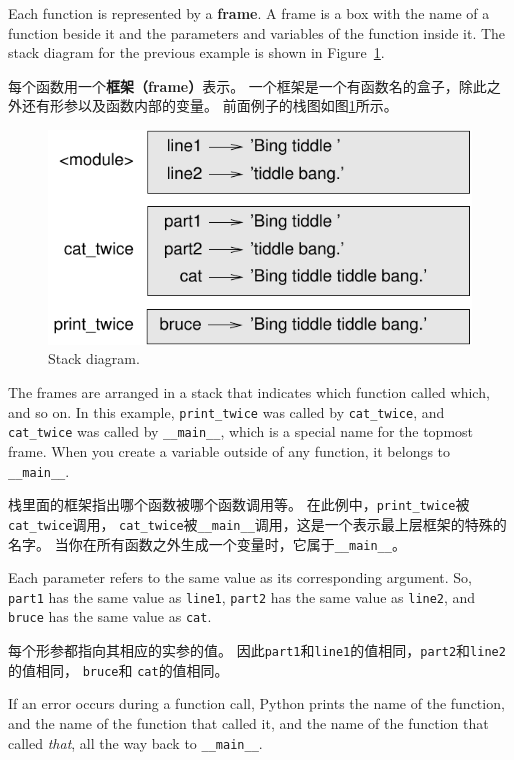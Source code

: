 \documentclass[10pt]{book}
\begin{document}
\begin{CJK}{UTF8}{gbsn}
Each function is represented by a {\bf frame}.  A frame is a box
with the name of a function
beside it and the parameters and variables of the function inside it.
The stack diagram for the
previous example is shown in Figure~\ref{fig.stack}.

每个函数用一个{\bf 框架（frame）}表示。
一个框架是一个有函数名的盒子，除此之外还有形参以及函数内部的变量。
前面例子的栈图如图\ref{fig.stack}所示。

\begin{figure}
\centerline
{\includegraphics[scale=0.8]{figs/stack.pdf}}
\caption{Stack diagram.}
\label{fig.stack}
\end{figure}


The frames are arranged in a stack that indicates which function
called which, and so on.  In this example, \verb"print_twice"
was called by \verb"cat_twice", and \verb"cat_twice" was called by 
\verb"__main__", which is a special name for the topmost frame.  When
you create a variable outside of any function, it belongs to 
\verb"__main__".

栈里面的框架指出哪个函数被哪个函数调用等。
在此例中，\verb"print_twice"被\verb"cat_twice"调用，
\verb"cat_twice"被\verb"__main__"调用，这是一个表示最上层框架的特殊的名字。
当你在所有函数之外生成一个变量时，它属于\verb"__main__"。

Each parameter refers to the same value as its corresponding
argument.  So, {\tt part1} has the same value as
{\tt line1}, {\tt part2} has the same value as {\tt line2},
and {\tt bruce} has the same value as {\tt cat}.

每个形参都指向其相应的实参的值。
因此{\tt part1}和{\tt line1}的值相同，{\tt part2}和{\tt line2}的值相同，
{\tt bruce}和 {\tt cat}的值相同。

If an error occurs during a function call, Python prints the
name of the function, and the name of the function that called
it, and the name of the function that called {\em that}, all the
way back to \verb"__main__".


\end{CJK}
\end{document}
